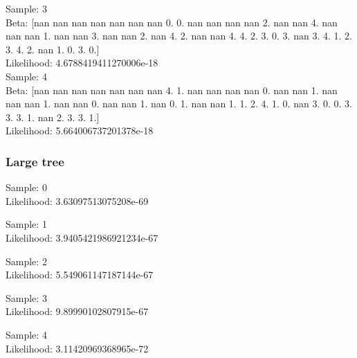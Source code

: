 \documentclass[11pt,a4paper]{article}
\begin{document}
	Sample:  3\\ 	Beta:  [nan nan nan nan nan nan nan  0.  0. nan nan nan nan  2. nan nan  4. nan
 nan nan  1. nan nan  3. nan nan  2. nan  4.  2. nan nan  4.  4.  2.  3.
  0.  3. nan  3.  4.  1.  2.  3.  4.  2. nan  1.  0.  3.  0.]\\
	Likelihood:  4.6788419411270006e-18\\

	Sample:  4\\ 	Beta:  [nan nan nan nan nan nan nan  4.  1. nan nan nan nan  0. nan nan  1. nan
 nan nan  1. nan nan  0. nan nan  1. nan  0.  1. nan nan  1.  1.  2.  4.
  1.  0. nan  3.  0.  0.  3.  3.  3.  1. nan  2.  3.  3.  1.]\\
	Likelihood:  5.664006737201378e-18\\

\subsubsection{Large tree}

Sample:  0 	\\
	Likelihood:  3.63097513075208e-69

	Sample:  1 	\\
	Likelihood:  3.9405421986921234e-67

	Sample:  2 	\\
	Likelihood:  5.549061147187144e-67

	Sample:  3 	\\
	Likelihood:  9.89990102807915e-67

	Sample:  4\\
	Likelihood:  3.11420969368965e-72
\end{document}
